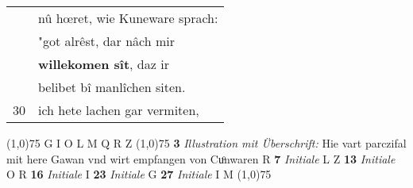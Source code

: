 \documentclass[8pt,a4paper,notitlepage]{article}
\begin{document}
\begin{table}[ht]
\begin{minipage}[t]{0.5\linewidth}
\begin{tabular}{rl}
 & nû hœret, wie Kuneware sprach:\\ 
 & "got alrêst, dar nâch mir\\ 
 & \textbf{willekomen sît}, daz ir\\ 
 & belibet bî manlîchen siten.\\ 
30 & ich hete lachen gar vermiten,\\ 
\end{tabular}
\scriptsize
\line(1,0){75} \newline
G I O L M Q R Z \newline
\line(1,0){75} \newline
\textbf{3} \textit{Illustration mit Überschrift:} Hie vart parczifal mit here Gawan vnd wirt empfangen von Cuͦnwaren R  \textbf{7} \textit{Initiale} L Z  \textbf{13} \textit{Initiale} O R  \textbf{16} \textit{Initiale} I  \textbf{23} \textit{Initiale} G  \textbf{27} \textit{Initiale} I M  \newline
\line(1,0){75} \newline

\end{minipage}
\end{table}
\end{document}
